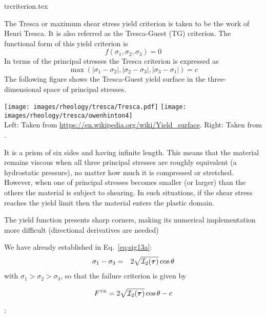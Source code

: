 
\begin{flushright} {\tiny {\color{gray} trcriterion.tex}} \end{flushright}

The Tresca or maximum shear stress yield criterion is taken to be the work of Henri Tresca. It is also referred as the Tresca-Guest (TG) criterion. The functional form of this yield criterion is
\[
f(\sigma_1,\sigma_2,\sigma_3) = 0
\]
In terms of the principal stresses the Tresca criterion is expressed as
\[
{\max(|\sigma_1 - \sigma_2| , |\sigma_2 - \sigma_3| , |\sigma_3 - \sigma_1| ) = c }
\]
The following figure shows the Tresca-Guest yield surface in the three-dimensional space of principal stresses. 
\begin{center}
\texttt{[image: images/rheology/tresca/Tresca.pdf]}
\texttt{[image: images/rheology/tresca/owenhinton4]}\\
{\captionfont Left: Taken from \url{https://en.wikipedia.org/wiki/Yield_surface}.
Right: Taken from \textcite{owhi}.}
\end{center}
It is a prism of six sides and having infinite length. This means that the 
material remains viscous when all three principal stresses are roughly equivalent 
(a hydrostatic pressure), no matter how much it is compressed or stretched. 
However, when one of principal stresses becomes smaller (or larger) than the others 
the material is subject to shearing. In such situations, if the shear 
stress reaches the yield limit then the material enters the plastic domain. 

\begin{remark}
The yield function presents sharp corners, making its numerical implementation 
more difficult (directional derivatives are needed)
\end{remark}

We have already established in Eq.~\eqref{eq:sig13a}:
\begin{eqnarray}
\sigma_1 - \sigma_3  &=& 2 \sqrt{{\cal I}_2({\bm \tau})} \cos \theta \nonumber
\end{eqnarray}
with $\sigma_1>\sigma_2>\sigma_3$,
so that the failure criterion is given by
\begin{mdframed}[backgroundcolor=blue!5]
\[
F^{\text{\tiny TR}}=2\sqrt{ {\cal I}_2({\bm \tau})  } \cos \theta - c 
\]
\end{mdframed}

\Literature: 

\vspace{.5cm}

